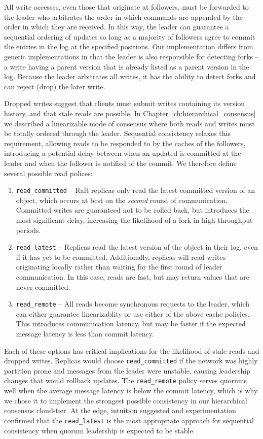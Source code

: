 All write accesses, even those that originate at followers, must be forwarded to the leader who arbitrates the order in which commands are appended by the order in which they are received.
In this way, the leader can guarantee a sequential ordering of updates so long as a majority of followers agree to commit the entries in the log at the specified positions.
Our implementation differs from generic implementations in that the leader is also responsible for detecting forks -- a write having a parent version that is already listed as a parent version in the log.
Because the leader arbitrates all writes, it has the ability to detect forks and can reject (drop) the later write.

Dropped writes suggest that clients must submit writes containing its version history, and that stale reads are possible.
In Chapter~\ref{ch:hierarchical_consensus} we described a linearizable mode of consensus where both reads and writes must be totally ordered through the leader.
Sequential consistency relaxes this requirement, allowing reads to be responded to by the caches of the followers, introducing a potential delay between when an updated is committed at the leader and when the follower is notified of the commit.
We therefore define several possible read polices:

\begin{enumerate}
    \item \texttt{read\_committed} -- Raft replicas only read the latest committed version of an object, which occurs at best on the \emph{second} round of communication.
    Committed writes are guaranteed not to be rolled back, but introduces the most significant delay, increasing the likelihood of a fork in high throughput periods.
    \item \texttt{read\_latest} -- Replicas read the latest version of the object in their log, even if it has yet to be committed.
    Additionally, replicas will read writes originating locally rather than waiting for the first round of leader communication.
    In this case, reads are fast, but may return values that are never committed.
    \item \texttt{read\_remote} -- All reads become synchronous requests to the leader, which can either guarantee linearizablity or use either of the above cache policies.
    This introduces communication latency, but may be faster if the expected message latency is less than commit latency.
\end{enumerate}

Each of these options has critical implications for the likelihood of stale reads and dropped writes.
Replicas would choose \texttt{read\_committed} if the network was highly partition prone and messages from the leader were unstable, causing leadership changes that would rollback updates.
The \texttt{read\_remote} policy serves quorums well when the average message latency is below the commit latency, which is why we chose it to implement the strongest possible consistency in our hierarchical consensus cloud-tier.
At the edge, intuition suggested and experimentation confirmed that the \texttt{read\_latest} is the most appropriate approach for sequential consistency when quorum leadership is expected to be stable.

